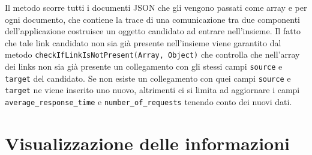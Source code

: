	Il metodo scorre tutti i documenti JSON che gli vengono passati come array e per ogni documento, che contiene la trace di una comunicazione tra due componenti dell'applicazione costruisce un oggetto candidato ad entrare nell'insieme. Il fatto che tale link candidato non sia già presente nell'insieme viene garantito dal metodo \texttt{checkIfLinkIsNotPresent(Array, Object)} che controlla che nell'array dei links non sia già presente un collegamento con gli stessi campi \texttt{source} e \texttt{target} del candidato. Se non esiste un collegamento con quei campi \texttt{source} e \texttt{target} ne viene inserito uno nuovo, altrimenti ci si limita ad aggiornare i campi \texttt{average\_response\_time} e \texttt{number\_of\_requests} tenendo conto dei nuovi dati. 

\section{Visualizzazione delle informazioni}

